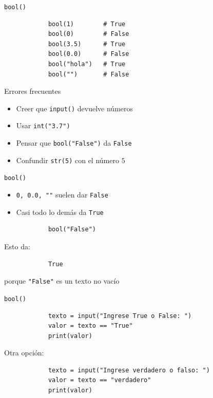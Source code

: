\documentclass{beamer}
\begin{document}
    \begin{frame}[fragile,t]{\texttt{bool()}}
        \begin{verbatim}
            bool(1)        # True
            bool(0)        # False
            bool(3.5)      # True
            bool(0.0)      # False
            bool("hola")   # True
            bool("")       # False
        \end{verbatim}
    \end{frame}

    \begin{frame}[fragile,t]{Errores frecuentes}
        \begin{itemize}
            \item Creer que \texttt{input()} devuelve números
            \item Usar \texttt{int("3.7")}
            \item Pensar que \texttt{bool("False")} da \texttt{False}
            \item Confundir \texttt{str(5)} con el número $5$
        \end{itemize}
    \end{frame}

    \begin{frame}[fragile,t]{\texttt{bool()}}
        \begin{itemize}
            \item \texttt{0, 0.0, ""} suelen dar \texttt{False}
            \item Casi todo lo demás da \texttt{True}
        \end{itemize}
        \begin{verbatim}
            bool("False")
        \end{verbatim}
        Esto da:
        \begin{verbatim}
            True
        \end{verbatim}
        porque \texttt{"False"} es un texto no vacío
    \end{frame}

    \begin{frame}[fragile,t]{\texttt{bool()}}
        \begin{verbatim}
            texto = input("Ingrese True o False: ")
            valor = texto == "True"
            print(valor)
        \end{verbatim}
        Otra opción:
        \begin{verbatim}
            texto = input("Ingrese verdadero o falso: ")
            valor = texto == "verdadero"
            print(valor)
        \end{verbatim}
    \end{frame}
\end{document}
